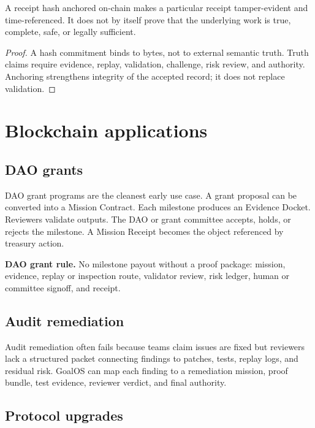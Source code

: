\begin{proposition}
A receipt hash anchored on-chain makes a particular receipt tamper-evident and time-referenced. It does not by itself prove that the underlying work is true, complete, safe, or legally sufficient.
\end{proposition}

\begin{proof}
A hash commitment binds to bytes, not to external semantic truth. Truth claims require evidence, replay, validation, challenge, risk review, and authority. Anchoring strengthens integrity of the accepted record; it does not replace validation.
\end{proof}

\section{Blockchain applications}

\subsection{DAO grants}

DAO grant programs are the cleanest early use case. A grant proposal can be converted into a Mission Contract. Each milestone produces an Evidence Docket. Reviewers validate outputs. The DAO or grant committee accepts, holds, or rejects the milestone. A Mission Receipt becomes the object referenced by treasury action.

\begin{standardbox}
\textbf{DAO grant rule.} No milestone payout without a proof package: mission, evidence, replay or inspection route, validator review, risk ledger, human or committee signoff, and receipt.
\end{standardbox}

\subsection{Audit remediation}

Audit remediation often fails because teams claim issues are fixed but reviewers lack a structured packet connecting findings to patches, tests, replay logs, and residual risk. GoalOS can map each finding to a remediation mission, proof bundle, test evidence, reviewer verdict, and final authority.

\subsection{Protocol upgrades}

